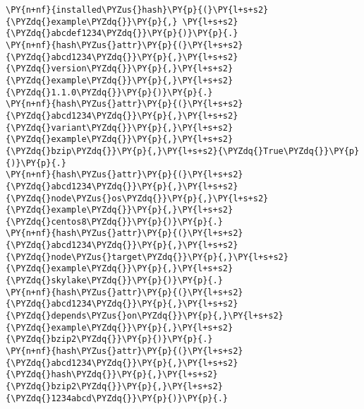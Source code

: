 \begin{Verbatim}[commandchars=\\\{\},fontsize=\footnotesize]
\PY{n+nf}{installed\PYZus{}hash}\PY{p}{(}\PY{l+s+s2}{\PYZdq{}example\PYZdq{}}\PY{p}{,} \PY{l+s+s2}{\PYZdq{}abcdef1234\PYZdq{}}\PY{p}{)}\PY{p}{.}
\PY{n+nf}{hash\PYZus{}attr}\PY{p}{(}\PY{l+s+s2}{\PYZdq{}abcd1234\PYZdq{}}\PY{p}{,}\PY{l+s+s2}{\PYZdq{}version\PYZdq{}}\PY{p}{,}\PY{l+s+s2}{\PYZdq{}example\PYZdq{}}\PY{p}{,}\PY{l+s+s2}{\PYZdq{}1.1.0\PYZdq{}}\PY{p}{)}\PY{p}{.}
\PY{n+nf}{hash\PYZus{}attr}\PY{p}{(}\PY{l+s+s2}{\PYZdq{}abcd1234\PYZdq{}}\PY{p}{,}\PY{l+s+s2}{\PYZdq{}variant\PYZdq{}}\PY{p}{,}\PY{l+s+s2}{\PYZdq{}example\PYZdq{}}\PY{p}{,}\PY{l+s+s2}{\PYZdq{}bzip\PYZdq{}}\PY{p}{,}\PY{l+s+s2}{\PYZdq{}True\PYZdq{}}\PY{p}{)}\PY{p}{.}
\PY{n+nf}{hash\PYZus{}attr}\PY{p}{(}\PY{l+s+s2}{\PYZdq{}abcd1234\PYZdq{}}\PY{p}{,}\PY{l+s+s2}{\PYZdq{}node\PYZus{}os\PYZdq{}}\PY{p}{,}\PY{l+s+s2}{\PYZdq{}example\PYZdq{}}\PY{p}{,}\PY{l+s+s2}{\PYZdq{}centos8\PYZdq{}}\PY{p}{)}\PY{p}{.}
\PY{n+nf}{hash\PYZus{}attr}\PY{p}{(}\PY{l+s+s2}{\PYZdq{}abcd1234\PYZdq{}}\PY{p}{,}\PY{l+s+s2}{\PYZdq{}node\PYZus{}target\PYZdq{}}\PY{p}{,}\PY{l+s+s2}{\PYZdq{}example\PYZdq{}}\PY{p}{,}\PY{l+s+s2}{\PYZdq{}skylake\PYZdq{}}\PY{p}{)}\PY{p}{.}
\PY{n+nf}{hash\PYZus{}attr}\PY{p}{(}\PY{l+s+s2}{\PYZdq{}abcd1234\PYZdq{}}\PY{p}{,}\PY{l+s+s2}{\PYZdq{}depends\PYZus{}on\PYZdq{}}\PY{p}{,}\PY{l+s+s2}{\PYZdq{}example\PYZdq{}}\PY{p}{,}\PY{l+s+s2}{\PYZdq{}bzip2\PYZdq{}}\PY{p}{)}\PY{p}{.}
\PY{n+nf}{hash\PYZus{}attr}\PY{p}{(}\PY{l+s+s2}{\PYZdq{}abcd1234\PYZdq{}}\PY{p}{,}\PY{l+s+s2}{\PYZdq{}hash\PYZdq{}}\PY{p}{,}\PY{l+s+s2}{\PYZdq{}bzip2\PYZdq{}}\PY{p}{,}\PY{l+s+s2}{\PYZdq{}1234abcd\PYZdq{}}\PY{p}{)}\PY{p}{.}
\end{Verbatim}
